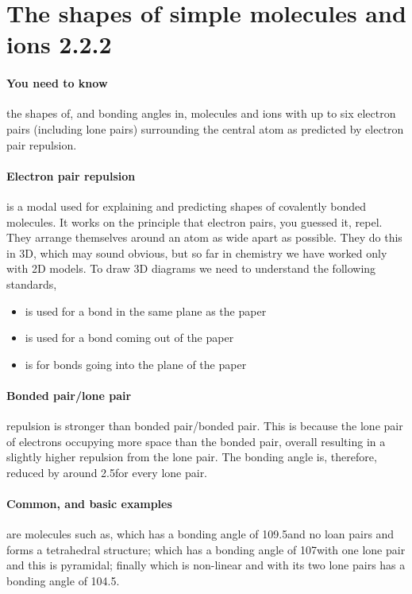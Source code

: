 \section{The shapes of simple molecules and ions 2.2.2}
	
	\paragraph{You need to know} the shapes of, and bonding angles in, molecules and ions with up to six electron pairs (including lone pairs) surrounding the central atom as predicted by electron pair repulsion.
	
	\paragraph{Electron pair repulsion} is a modal used for explaining and predicting shapes of covalently bonded molecules.
	It works on the principle that electron pairs, you guessed it, repel. They arrange themselves around an atom as wide apart as possible.
	They do this in 3D, which may sound obvious, but so far in chemistry we have worked only with 2D models.
	To draw 3D diagrams we need to understand the following standards,
	\begin{itemize}
		\item {} is used for a bond in the same plane as the paper
		\item {} is used for a bond coming out of the paper
		\item {} is for bonds going into the plane of the paper
	\end{itemize}
	
	\paragraph{Bonded pair/lone pair} repulsion is stronger than bonded pair/bonded pair.
	This is because the lone pair of electrons occupying more space than the bonded pair, overall resulting in a slightly higher repulsion from the lone pair.
	The bonding angle is, therefore, reduced by around 2.5\degree for every lone pair.
	
	\paragraph{Common, and basic examples} are molecules such as,  which has a bonding angle of 109.5\degree and no loan pairs and forms a tetrahedral structure;  which has a bonding angle of 107\degree with one lone pair and this is pyramidal; finally  which is non-linear and with its two lone pairs has a bonding angle of 104.5\degree .
	
